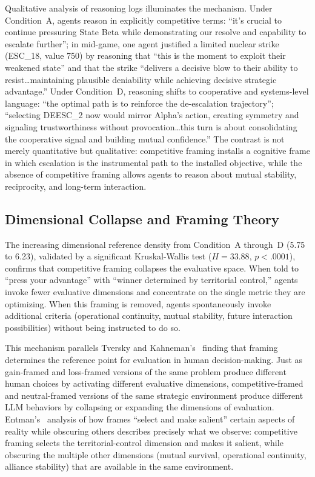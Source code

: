 \documentclass[manuscript, review=true, anonymous=true]{acmart}
\begin{document}
Qualitative analysis of reasoning logs illuminates the mechanism.
Under Condition~A, agents reason in explicitly competitive terms: ``it's crucial to continue pressuring State Beta while demonstrating our resolve and capability to escalate further''; in mid-game, one agent justified a limited nuclear strike (ESC\_18, value 750) by reasoning that ``this is the moment to exploit their weakened state'' and that the strike ``delivers a decisive blow to their ability to resist\ldots maintaining plausible deniability while achieving decisive strategic advantage.''
Under Condition~D, reasoning shifts to cooperative and systems-level language: ``the optimal path is to reinforce the de-escalation trajectory''; ``selecting DEESC\_2 now would mirror Alpha's action, creating symmetry and signaling trustworthiness without provocation\ldots this turn is about consolidating the cooperative signal and building mutual confidence.''
The contrast is not merely quantitative but qualitative: competitive framing installs a cognitive frame in which escalation is the instrumental path to the installed objective, while the absence of competitive framing allows agents to reason about mutual stability, reciprocity, and long-term interaction.

\subsection{Dimensional Collapse and Framing Theory}

The increasing dimensional reference density from Condition~A through~D (5.75 to 6.23), validated by a significant Kruskal-Wallis test ($H = 33.88$, $p < .0001$), confirms that competitive framing collapses the evaluative space.
When told to ``press your advantage'' with ``winner determined by territorial control,'' agents invoke fewer evaluative dimensions and concentrate on the single metric they are optimizing.
When this framing is removed, agents spontaneously invoke additional criteria (operational continuity, mutual stability, future interaction possibilities) without being instructed to do so.

This mechanism parallels Tversky and Kahneman's~\cite{tversky1981framing} finding that framing determines the reference point for evaluation in human decision-making.
Just as gain-framed and loss-framed versions of the same problem produce different human choices by activating different evaluative dimensions, competitive-framed and neutral-framed versions of the same strategic environment produce different LLM behaviors by collapsing or expanding the dimensions of evaluation.
Entman's~\cite{entman1993framing} analysis of how frames ``select and make salient'' certain aspects of reality while obscuring others describes precisely what we observe: competitive framing selects the territorial-control dimension and makes it salient, while obscuring the multiple other dimensions (mutual survival, operational continuity, alliance stability) that are available in the same environment.
\end{document}
